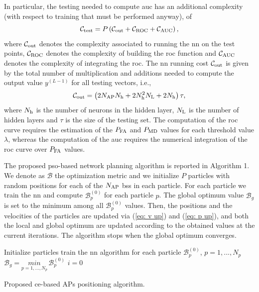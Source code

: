 \documentclass[conference,draftcls,onecolumn]{IEEEtran}
\begin{document}
In particular, the testing needed to compute \ac{auc} has an additional complexity (with respect to training that must be performed anyway), of 
\begin{equation}
    \mathcal{C}_{\rm test} = P \left( \mathcal{C}_{\rm out}+\mathcal{C}_{\rm ROC}+\mathcal{C}_{\rm AUC}\right),
\end{equation}
where  $\mathcal{C}_{\rm out}$ denotes the complexity associated to running the \ac{nn} on the test points, $\mathcal{C}_{\rm ROC}$ denotes the complexity of building the \ac{roc} function and $\mathcal{C}_{\rm AUC}$ denotes the complexity of integrating the \ac{roc}. The \ac{nn} running cost $\mathcal{C}_{\rm out}$ is given by the total number of multiplication and additions needed to compute the output value $y^{(L-1)}$ for all testing vectors, i.e.,
\begin{equation}
    \mathcal{C}_{\rm out} = \left(2N_{\rm AP}N_{\rm h}+2N_{\rm h}^2N_{\rm L} + 2N_{\rm h}\right)\tau ,
\end{equation}
where $N_{\rm h}$ is the number of neurons in the hidden layer, $N_{\rm L}$ is the number of hidden layers and $\tau$ is the size of the testing set.
The computation of the \ac{roc} curve requires the estimation of the $P_{\rm FA}$ and $P_{\rm MD}$ values for each threshold value $\lambda$, whereas the computation of the \ac{auc} requires the numerical integration of the \ac{roc} curve over $P_{\rm FA}$ values.

The proposed \ac{pso}-based network planning algorithm is reported in Algorithm 1. We denote as $\mathcal{B}$ the optimization metric and we initialize $P$ particles with random positions for each of the $N_{\rm AP}$ \acp{bs} in each particle. For each particle we train the \ac{nn} and compute $\mathcal{B}_p^{(0)}$ for each particle $p$. The global optimum value $\mathcal{B}_g$ is set to the minimum among all $\mathcal{B}_p^{(0)}$ values. Then, the positions and the velocities of the particles are updated via (\ref{eq: v up}) and (\ref{eq: p up}), and both the local and global optimum are updated according to the obtained values at the current iterations. The algorithm stops when the global optimum converges.

 \begin{algorithm}[b!]

\small

  Initialize particles\;
  train the \ac{nn} algorithm for each particle\;
  $\mathcal{B}_p^{(0)}$, $p=1,...,N_p$\;
  $\mathcal{B}_g=\underset{p=1,...,N_p}{min} \, \mathcal{B}_p^{(0)}$\;
  $i = 0$\;

      
\caption{Proposed \ac{ce}-based APs positioning algorithm.}
 \end{algorithm}      
\end{document}
